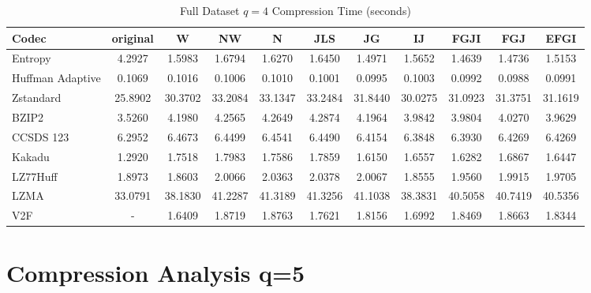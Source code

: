 \documentclass{article}
\begin{document}
\begin{table}[h!]
\centering
\caption{Full Dataset $q=4$ Compression Time (seconds)}
\begin{tabular}{|l|cccccccccc|}
\hline
Codec &  original &       W &      NW &       N &     JLS &      JG &      IJ &    FGJI &     FGJ &    EFGI \\
\hline
Entropy & 4.2927 & 1.5983 & 1.6794 & 1.6270 & 1.6450 & 1.4971 & 1.5652 & 1.4639 & 1.4736 & 1.5153         \\
\hline
Huffman Adaptive &    0.1069 &  0.1016 &  0.1006 &  0.1010 &  0.1001 &  0.0995 &  0.1003 &  0.0992 &  0.0988 &  0.0991 \\
Zstandard        &   25.8902 & 30.3702 & 33.2084 & 33.1347 & 33.2484 & 31.8440 & 30.0275 & 31.0923 & 31.3751 & 31.1619 \\
BZIP2            &    3.5260 &  4.1980 &  4.2565 &  4.2649 &  4.2874 &  4.1964 &  3.9842 &  3.9804 &  4.0270 &  3.9629 \\
CCSDS 123        &    6.2952 &  6.4673 &  6.4499 &  6.4541 &  6.4490 &  6.4154 &  6.3848 &  6.3930 &  6.4269 &  6.4269 \\
Kakadu           &    1.2920 &  1.7518 &  1.7983 &  1.7586 &  1.7859 &  1.6150 &  1.6557 &  1.6282 &  1.6867 &  1.6447 \\
LZ77Huff         &    1.8973 &  1.8603 &  2.0066 &  2.0363 &  2.0378 &  2.0067 &  1.8555 &  1.9560 &  1.9915 &  1.9705 \\
LZMA             &   33.0791 & 38.1830 & 41.2287 & 41.3189 & 41.3256 & 41.1038 & 38.3831 & 40.5058 & 40.7419 & 40.5356 \\
V2F              &    - &  1.6409 &  1.8719 &  1.8763 &  1.7621 &  1.8156 &  1.6992 &  1.8469 &  1.8663 &  1.8344 \\
\hline
\end{tabular}
\end{table}

\newpage
\section{Compression Analysis q=5}
\end{document}
